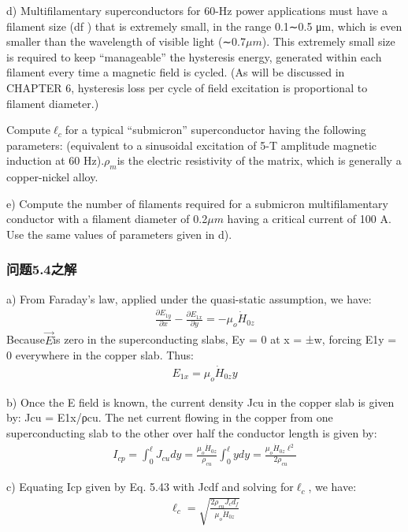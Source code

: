 d) Multifilamentary superconductors for 60-Hz power applications must have a
filament size (df ) that is extremely small, in the range 0.1∼0.5 μm, which
is even smaller than the wavelength of visible light (∼0.7$\mu m$). This extremely
small size is required to keep “manageable” the hysteresis energy,
generated within each filament every time a magnetic field is cycled. (As
will be discussed in CHAPTER 6, hysteresis loss per cycle of field excitation
is proportional to filament diameter.)

Compute$\ell_c$for a typical “submicron” superconductor having the following
parameters:
(equivalent to a sinusoidal excitation of 5-T amplitude magnetic induction
at 60 Hz).$\rho_m$is the electric resistivity of the matrix, which is generally a
copper-nickel alloy.

e) Compute the number of filaments required for a submicron multifilamentary
conductor with a filament diameter of 0.2$\mu m$ having a critical current of
100 A. Use the same values of parameters given in d).

\subsubsection{问题5.4之解}
a) From Faraday’s law, applied under the quasi-static assumption, we have:
\begin{align*}%
\frac{\partial E_{1y}}{\partial x}-\frac{\partial E_{1x}}{\partial y}=-\mu_{o}\dot{H}_{0z}\tag{S4.1}
\end{align*}
Because$\vec{E}$is zero in the superconducting slabs, Ey = 0 at x = ±w, forcing E1y = 0
everywhere in the copper slab. Thus:
\begin{align*}%
E_{1x}=\mu_{o}\dot{H}_{0z}y\tag{5.42}
\end{align*}

b) Once the E field is known, the current density Jcu in the copper slab is given
by: Jcu = E1x/ρcu. The net current flowing in the copper from one superconducting
slab to the other over half the conductor length is given by:
\begin{align*}%
I_{cp}=\int_{0}^{\ell}J_{cu}dy=\frac{\mu_{o}\dot{H}_{0z}}{\rho_{cu}}\int_{0}^{\ell}ydy=\frac{\mu_{o}\dot{H}_{0z}\ell^{2}}{2\rho_{cu}}\tag{5.43}
\end{align*}

c) Equating Icp given by Eq. 5.43 with Jcdf and solving for$\ell_c$, we have:
\begin{align*}%
\ell_{c}=\sqrt{\frac{2\rho_{cu}J_{c}d_{f}}{\mu_{o}\dot{H}_{0z}}}\tag{5.44}
\end{align*}

